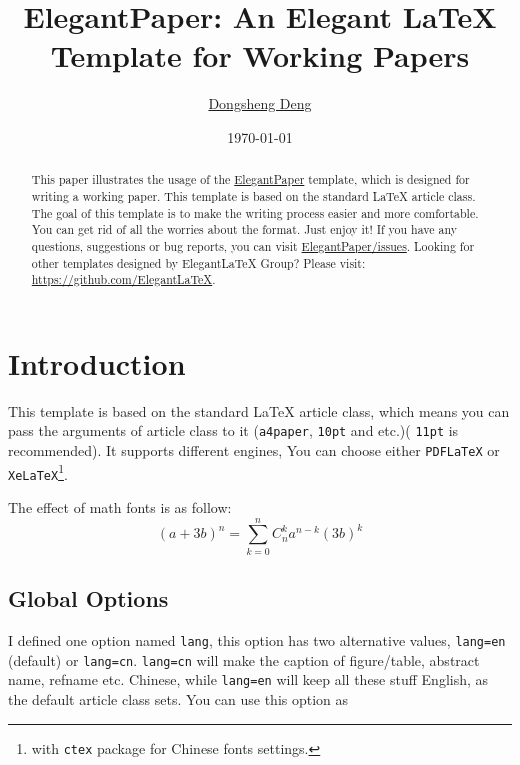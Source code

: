 \documentclass[11pt]{elegantpaper}
\title{ElegantPaper: An Elegant \LaTeX{} Template for Working Papers}
\author{\href{https://ddswhu.me/}{Dongsheng Deng}}
\institute{\href{https://github.com/ElegantLaTeX}{Elegant\LaTeX{} Program}}
\date{\today}
\begin{document}
\maketitle

\begin{abstract}
\noindent This paper illustrates the usage of the \href{https://github.com/ElegantLaTeX/ElegantPaper}{ElegantPaper} template, which is designed for writing a working paper. This template is based on the standard \LaTeX{} article class. The goal of this template is to make the writing process easier and more comfortable. You can get rid of all the worries about the format. Just enjoy it! If you have any questions, suggestions or bug reports, you can visit \href{https://github.com/ElegantLaTeX/ElegantPaper/issues}{ElegantPaper/issues}. Looking for other templates designed by Elegant\LaTeX{} Group? Please visit: \href{https://github.com/ElegantLaTeX}{https://github.com/ElegantLaTeX}.\par
{}
\end{abstract}


\section{Introduction}

This template is based on the standard \LaTeX{} article class, which means you can pass the arguments of article class to it (\lstinline{a4paper}, \lstinline{10pt} and etc.)( \lstinline{11pt} is recommended). It supports different engines, You can choose either \lstinline{PDFLaTeX} or \lstinline{XeLaTeX}\footnote{with \lstinline{ctex} package for Chinese fonts settings.}.  

The effect of math fonts is as follow:
\begin{equation}
(a+3b)^{n} = \sum_{k=0}^{n} C_{n}^{k} a^{n-k} (3b)^k  \label{eq:binom}
\end{equation}

\subsection{Global Options}
I defined one option named \lstinline{lang}, this option has two alternative values, \lstinline{lang=en} (default) or \lstinline{lang=cn}. \lstinline{lang=cn} will make the caption of figure/table, abstract name, refname etc. Chinese, while \lstinline{lang=en} will keep all these stuff English, as the default article class sets. You can use this option as
\end{document}
